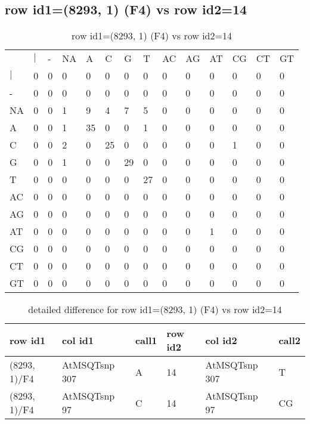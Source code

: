 \subsection{row id1=(8293, 1) (F4) vs row id2=14}
\begin{center}
\begin{longtable}{|l|l|l|l|l|l|l|l|l|l|l|l|l|l|}
\caption{row id1=(8293, 1) (F4) vs row id2=14} \label{table_dm464}\\
\hline
\\
\hline
&$|$&-&NA&A&C&G&T&AC&AG&AT&CG&CT&GT\\
$|$&0&0&0&0&0&0&0&0&0&0&0&0&0\\
-&0&0&0&0&0&0&0&0&0&0&0&0&0\\
NA&0&0&1&9&4&7&5&0&0&0&0&0&0\\
A&0&0&1&35&0&0&1&0&0&0&0&0&0\\
C&0&0&2&0&25&0&0&0&0&0&1&0&0\\
G&0&0&1&0&0&29&0&0&0&0&0&0&0\\
T&0&0&0&0&0&0&27&0&0&0&0&0&0\\
AC&0&0&0&0&0&0&0&0&0&0&0&0&0\\
AG&0&0&0&0&0&0&0&0&0&0&0&0&0\\
AT&0&0&0&0&0&0&0&0&0&1&0&0&0\\
CG&0&0&0&0&0&0&0&0&0&0&0&0&0\\
CT&0&0&0&0&0&0&0&0&0&0&0&0&0\\
GT&0&0&0&0&0&0&0&0&0&0&0&0&0\\
\hline
\end{longtable}
\end{center}

\begin{center}
\begin{longtable}{|l|l|l|l|l|l|}
\caption{detailed difference for row id1=(8293, 1) (F4) vs row id2=14} \label{table_dm465}\\
\hline
row id1&col id1&call1&row id2&col id2&call2\\
\hline
(8293, 1)/F4&AtMSQTsnp 307&A&14&AtMSQTsnp 307&T\\
(8293, 1)/F4&AtMSQTsnp 97&C&14&AtMSQTsnp 97&CG\\
\hline
\end{longtable}
\end{center}

